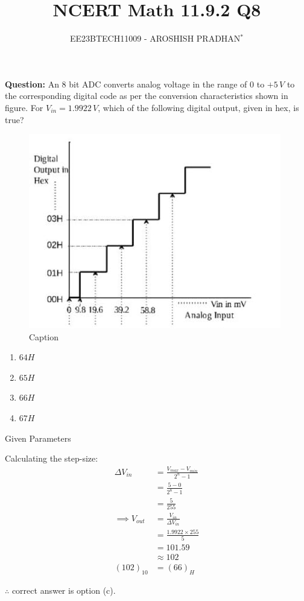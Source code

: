 \documentclass[journal,12pt,twocolumn]{IEEEtran}
\theoremstyle{remark}
\begin{document}

\vspace{3cm}

\title{NCERT Math 11.9.2 Q8}
\author{EE23BTECH11009 - AROSHISH PRADHAN$^{*}$%
}
\maketitle
\newpage
\bigskip
\textbf{Question:} An $8$ bit ADC converts analog voltage in the range of $0$ to $+5\, V$ to the corresponding digital code as per the conversion characteristics shown in figure. For $V_{in} = 1.9922\, V$, which of the following digital output, given in hex, is true?

\begin{figure}[!h]
    \centering
    \includegraphics[width=\columnwidth]{figs/fig1.jpeg}
    \caption{Caption}
    \label{fig:ADC}
\end{figure}
\begin{enumerate}[label=(\alph*)]
    \item $64H$
    \item $65H$
    \item $66H$
    \item $67H$
\end{enumerate}

\solution
\begin{table}[!h]
    \centering
    \resizebox{\columnwidth}{!}{}
    \caption{Given Parameters}
    \label{tab:1}
\end{table}

Calculating the step-size:
\begin{align}
    \Delta V_{in} &= \frac{V_{max} - V_{min}}{2^n - 1}\\
    &= \frac{5 - 0}{2^8 - 1}\\
    &= \frac{5}{255}\\
   \implies V_{out} &= \frac{V_{in}}{\Delta V_{in}}\\
    &= \frac{1.9922 \times 255}{5}\\
    &= 101.59\\
    &\approx 102\\
    (102)_{10} &= (66)_{H}
\end{align}

$\therefore$ correct answer is option (c).
\end{document}

